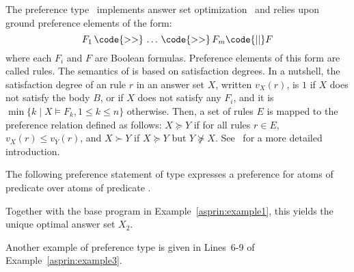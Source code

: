 The preference type~ implements answer set optimization~\cite{brnitr03a} and relies upon
ground preference elements of the form:
\[ F_1 \, \code{>>} \, \dots \, \code{>>} \, F_m \code{ || }F\]
where each $F_i$ and $F$ are Boolean formulas.
Preference elements of this form are called  rules.  
The semantics of  is based on satisfaction degrees.
In a nutshell,
the satisfaction degree of an  rule $r$ in an answer set $X$, 
written $v_X(r)$, is 
$1$ if $X$ does not satisfy the body $B$, %
or  if $X$ does not satisfy any $F_i$, 
and it is $\min\{k \mid X \models F_k, 1\leq k\leq n\}$ otherwise.
Then, a set of  rules $E$ is mapped to the preference relation defined as follows:
$X \succeq Y$ if for all rules $r \in E$, $v_X(r) \leq v_Y(r)$, 
and $X \succ Y$ if $X \succeq Y$ but $Y \not\succeq X$. 
See~\cite{brnitr03a} for a more detailed introduction.

%
\begin{example}\label{asprin:asoexample}
%
%
The following preference statement of type  expresses a preference 
for atoms of predicate \code{a/1} over atoms of predicate \code{b/1}.
%

%
Together with the base program in Example~\ref{asprin:example1}, this yields the unique optimal answer set $X_2$.  
\end{example} %
Another example of preference type  is given in Lines~6-9 of Example~\ref{asprin:example3}.


